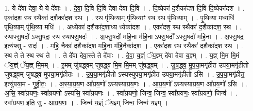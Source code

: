 \documentclass[17pt]{extarticle}
\begin{document}
1. ये दे॑वा देवा॒ ये ये दे॑वाः । . दे॒वा॒ दि॒वि दि॒वि दे॑वा देवा दि॒वि । . दि॒व्येका॑ द॒शैका॑दश दि॒वि दि॒व्येका॑दश । . एका॑दश॒ स्थ स्थैका॑ द॒शैका॑दश॒ स्थ । . स्थ पृ॑थि॒व्याम् पृ॑थि॒व्याꣳ स्थ स्थ पृ॑थि॒व्याम् । . पृ॒थि॒व्या मध्यधि॑ पृथि॒व्याम् पृ॑थि॒व्या मधि॑ । . अध्येका॑ द॒शैका॑द॒शाध्य ध्येका॑दश । . एका॑दश॒ स्थ स्थैका॑ द॒शैका॑दश॒ स्थ । . स्थाफ्सु॒षदो᳚ ऽफ्सु॒षदः॒ स्थ स्थाफ्सु॒षदः॑ । . अ॒फ्सु॒षदो॑ महि॒ना म॑हि॒ना ऽफ्सु॒षदो᳚ ऽफ्सु॒षदो॑ महि॒ना । . अ॒फ्सु॒षद॒ इत्य॑फ्सु - सदः॑ । . म॒हि॒ नैका॑ द॒शैका॑दश महि॒ना म॑हि॒नैका॑दश । . एका॑दश॒ स्थ स्थैका॑ द॒शैका॑दश॒ स्थ । . स्थ ते ते स्थ स्थ ते । . ते दे॑वा देवा॒स्ते ते दे॑वाः । . दे॒वा॒ य॒ज्ञ्ं ॅय॒ज्ञ्म् दे॑वा देवा य॒ज्ञ्म् । . य॒ज्ञ् मि॒म मि॒मं ॅय॒ज्ञ्ं ॅय॒ज्ञ् मि॒मम् । . इ॒मम् जु॑षद्ध्वम् जुषद्ध्व मि॒म मि॒मम् जु॑षद्ध्वम् । . जु॒ष॒द्ध्व॒ मु॒प॒या॒मगृ॑हीत उपया॒मगृ॑हीतो जुषद्ध्वम् जुषद्ध्व मुपया॒मगृ॑हीतः । . उ॒प॒या॒मगृ॑हीतो ऽस्यस्युपया॒मगृ॑हीत उपया॒मगृ॑हीतो ऽसि । . उ॒प॒या॒मगृ॑हीत॒ इत्यु॑पया॒म - गृ॒ही॒तः॒ । . अ॒स्या॒ग्र॒य॒ण आ᳚ग्रय॒णो᳚ ऽस्यस्याग्रय॒णः । . आ॒ग्र॒य॒णो᳚ ऽस्यस्याग्रय॒ण आ᳚ग्रय॒णो॑ ऽसि । . अ॒सि॒ स्वा᳚ग्रयणः॒ स्वा᳚ग्रयणो ऽस्यसि॒ स्वा᳚ग्रयणः । . स्वा᳚ग्रयणो॒ जिन्व॒ जिन्व॒ स्वा᳚ग्रयणः॒ स्वा᳚ग्रयणो॒ जिन्व॑ । . स्वा᳚ग्रयण॒ इति॒ सु - आ॒ग्र॒य॒णः॒ । . जिन्व॑ य॒ज्ञ्ं ॅय॒ज्ञ्म् जिन्व॒ जिन्व॑ य॒ज्ञ्म् । \newline
\end{document}
